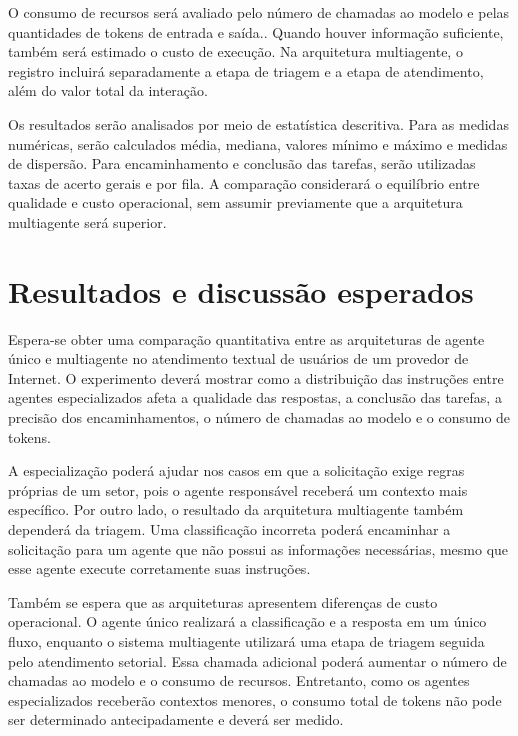 \documentclass[11pt]{ifscarticle}
\begin{document}
O consumo de recursos será avaliado pelo número de chamadas ao modelo e pelas quantidades de tokens de entrada e saída.. Quando houver informação suficiente, também será estimado o custo de execução. Na arquitetura multiagente, o registro incluirá separadamente a etapa de triagem e a etapa de atendimento, além do valor total da interação.

Os resultados serão analisados por meio de estatística descritiva. Para as medidas numéricas, serão calculados média, mediana, valores mínimo e máximo e medidas de dispersão. Para encaminhamento e conclusão das tarefas, serão utilizadas taxas de acerto gerais e por fila. A comparação considerará o equilíbrio entre qualidade e custo operacional, sem assumir previamente que a arquitetura multiagente será superior.

\section{Resultados e discussão esperados}

Espera-se obter uma comparação quantitativa entre as arquiteturas de agente único e multiagente no atendimento textual de usuários de um provedor de Internet. O experimento deverá mostrar como a distribuição das instruções entre agentes especializados afeta a qualidade das respostas, a conclusão das tarefas, a precisão dos encaminhamentos, o número de chamadas ao modelo e o consumo de tokens.

A especialização poderá ajudar nos casos em que a solicitação exige regras próprias de um setor, pois o agente responsável receberá um contexto mais específico. Por outro lado, o resultado da arquitetura multiagente também dependerá da triagem. Uma classificação incorreta poderá encaminhar a solicitação para um agente que não possui as informações necessárias, mesmo que esse agente execute corretamente suas instruções.

Também se espera que as arquiteturas apresentem diferenças de custo operacional. O agente único realizará a classificação e a resposta em um único fluxo, enquanto o sistema multiagente utilizará uma etapa de triagem seguida pelo atendimento setorial. Essa chamada adicional poderá aumentar o número de chamadas ao modelo e o consumo de recursos. Entretanto, como os agentes especializados receberão contextos menores, o consumo total de tokens não pode ser determinado antecipadamente e deverá ser medido.
\end{document}
